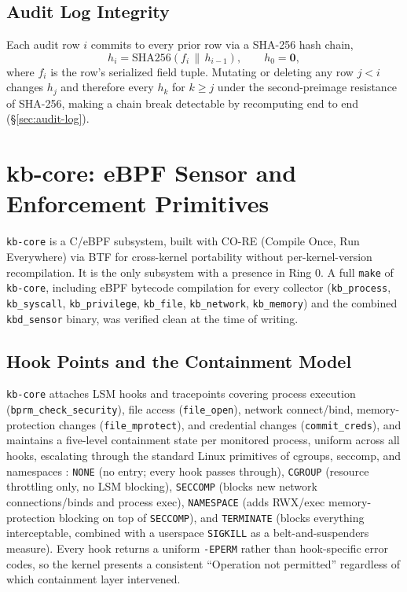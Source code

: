 \documentclass{article}
\begin{document}
\subsection{Audit Log Integrity}
\label{sec:math-audit}

Each audit row $i$ commits to every prior row via a SHA-256 hash chain,
\begin{equation}
  h_i = \mathrm{SHA256}(f_i \,\|\, h_{i-1}), \qquad h_0 = \mathbf{0},
  \label{eq:hashchain}
\end{equation}
where $f_i$ is the row's serialized field tuple. Mutating or deleting
any row $j < i$ changes $h_j$ and therefore every $h_k$ for $k \geq j$
under the second-preimage resistance of SHA-256, making a chain break
detectable by recomputing  end to end
(\S\ref{sec:audit-log}).

\section{kb-core: eBPF Sensor and Enforcement Primitives}
\label{sec:core}

\texttt{kb-core} is a C/eBPF subsystem, built with CO-RE (Compile Once,
Run Everywhere) via BTF for cross-kernel portability without
per-kernel-version recompilation. It is the only subsystem with a
presence in Ring 0. A full \texttt{make} of \texttt{kb-core}, including
eBPF bytecode compilation for every collector
(\texttt{kb\_process}, \texttt{kb\_syscall}, \texttt{kb\_privilege},
\texttt{kb\_file}, \texttt{kb\_network}, \texttt{kb\_memory}) and the
combined \texttt{kbd\_sensor} binary, was verified clean at the time of
writing.

\subsection{Hook Points and the Containment Model}

\texttt{kb-core} attaches LSM hooks and tracepoints covering process
execution (\texttt{bprm\_check\_security}), file access
(\texttt{file\_open}), network connect/bind, memory-protection changes
(\texttt{file\_mprotect}), and credential changes
(\texttt{commit\_creds}), and maintains a five-level containment state
per monitored process, uniform across all hooks, escalating through the
standard Linux primitives of cgroups, seccomp, and namespaces
\citep{kerrisk2010linux}:
\texttt{NONE} (no entry; every hook passes through), \texttt{CGROUP}
(resource throttling only, no LSM blocking), \texttt{SECCOMP} (blocks
new network connections/binds and process exec), \texttt{NAMESPACE}
(adds RWX/exec memory-protection blocking on top of \texttt{SECCOMP}),
and \texttt{TERMINATE} (blocks everything interceptable, combined with
a userspace \texttt{SIGKILL} as a belt-and-suspenders measure). Every
hook returns a uniform \texttt{-EPERM} rather than hook-specific error
codes, so the kernel presents a consistent ``Operation not permitted''
regardless of which containment layer intervened.
\end{document}
